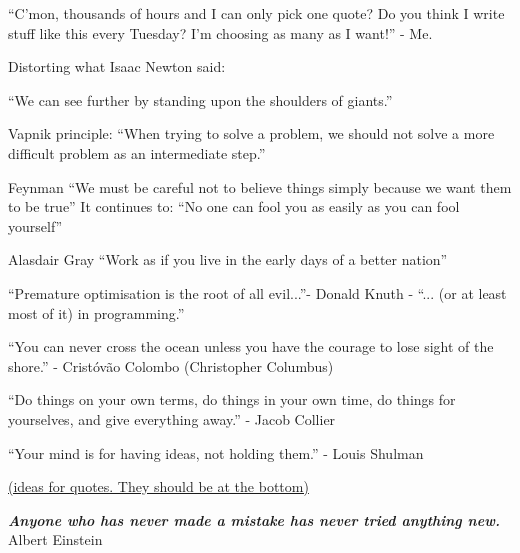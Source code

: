 ``C'mon, thousands of hours and I can only pick one quote? Do you think I write stuff like this every Tuesday? I'm choosing as many as I want!'' - Me.


Distorting what Isaac Newton said:

``We can see further by standing upon the shoulders of giants.''

Vapnik principle:
``When trying to solve a problem, we should not solve a more difficult problem as an intermediate step.''

Feynman
``We must be careful not to believe things simply because we want them to be true''
It continues to: ``No one can fool you as easily as you can fool yourself''

Alasdair Gray
``Work as if you live in the early days of a better nation''


``Premature optimisation is the root of all evil...''- Donald Knuth - ``... (or at least most of it) in programming.''


``You can never cross the ocean unless you have the courage to lose sight of the shore.'' - Cristóvão Colombo (Christopher Columbus)


``Do things on your own terms, do things in your own time, do things for yourselves, and give everything away.'' - Jacob Collier


``Your mind is for having ideas, not holding them.'' - Louis Shulman



\ul{(ideas for quotes. They should be at the bottom)}


\thispagestyle{empty}
\hbox{} \vfill
\begin{flushright}
\small \textit{\textbf{Anyone who has never made a mistake has never tried anything new.}}
\\ \vspace{2mm}  
\scriptsize Albert Einstein
\end{flushright}

\clearpage
\thispagestyle{empty}
\cleardoublepage

